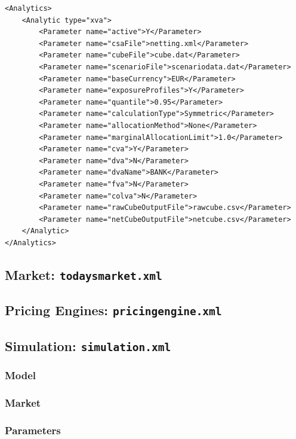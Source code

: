 \documentclass[12pt, a4paper]{article}
\begin{document}
\begin{lstlisting}[caption={ORE analytic: xva},
 	label=lst:ore_xva]
<Analytics>
	<Analytic type="xva">
		<Parameter name="active">Y</Parameter>
		<Parameter name="csaFile">netting.xml</Parameter>
		<Parameter name="cubeFile">cube.dat</Parameter>
		<Parameter name="scenarioFile">scenariodata.dat</Parameter>
		<Parameter name="baseCurrency">EUR</Parameter>
		<Parameter name="exposureProfiles">Y</Parameter>
		<Parameter name="quantile">0.95</Parameter>
		<Parameter name="calculationType">Symmetric</Parameter>      
		<Parameter name="allocationMethod">None</Parameter>    
		<Parameter name="marginalAllocationLimit">1.0</Parameter>    
		<Parameter name="cva">Y</Parameter>
		<Parameter name="dva">N</Parameter>
		<Parameter name="dvaName">BANK</Parameter>
		<Parameter name="fva">N</Parameter>
		<Parameter name="colva">N</Parameter>
		<Parameter name="rawCubeOutputFile">rawcube.csv</Parameter>
		<Parameter name="netCubeOutputFile">netcube.csv</Parameter>     
	</Analytic>
</Analytics>
\end{lstlisting}

\subsection{Market: {\tt todaysmarket.xml}}\label{sec:market}

\subsection{Pricing Engines: {\tt pricingengine.xml}}

\subsection{Simulation: {\tt simulation.xml}}
\subsubsection{Model}
\subsubsection{Market}
\subsubsection{Parameters}
\end{document}
